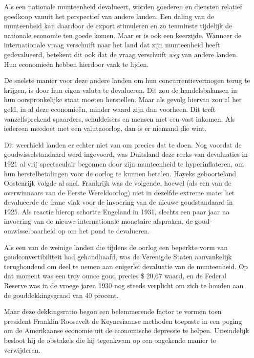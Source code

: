 \documentclass[
  a5paper,
  smalldemyvopaper,11pt,twoside,onecolumn,openright,extrafontsizes]{memoir}
\begin{document}
Als een nationale munteenheid devalueert, worden goederen en diensten
relatief goedkoop vanuit het perspectief van andere landen. Een daling
van de munteenheid kan daardoor de export stimuleren en zo tenminste
tijdelijk de nationale economie ten goede komen. Maar er is ook een
keerzijde. Wanneer de internationale vraag verschuift naar het land dat
zijn munteenheid heeft gedevalueerd, betekent dit ook dat de vraag
verschuift \emph{weg} van andere landen. Hun economieën hebben hierdoor
vaak te lijden.

De snelste manier voor deze andere landen om hun concurrentievermogen
terug te krijgen, is door hun eigen valuta te devalueren. Dit zou de
handelsbalansen in hun oorspronkelijke staat moeten herstellen. Maar als
gevolg hiervan zou al het geld, in al deze economieën, minder waard zijn
dan voorheen. Dit treft vanzelfsprekend spaarders, schuldeisers en
mensen met een vast inkomen. Als iedereen meedoet met een valutaoorlog,
dan is er niemand die wint.

Dit weerhield landen er echter niet van om precies dat te doen. Nog
voordat de goudwisselstandaard werd ingevoerd, was Duitsland deze reeks
van devaluaties in 1921 al vrij spectaculair begonnen door zijn
munteenheid te hyperinflateren, om hun herstelbetalingen voor de oorlog
te kunnen betalen. Hayeks geboorteland Oostenrijk volgde al snel.
Frankrijk was de volgende, hoewel (als een van de overwinnaars van de
Eerste Wereldoorlog) niet in dezelfde extreme mate: het devalueerde de
franc vlak voor de invoering van de nieuwe goudstandaard in 1925. Als
reactie hierop schortte Engeland in 1931, slechts een paar jaar na
invoering van de nieuwe internationale monetaire afspraken, de
goud-omwisselbaarheid op om het pond te devalueren.

Als een van de weinige landen die tijdens de oorlog een beperkte vorm
van goudconvertibiliteit had gehandhaafd, was de Verenigde Staten
aanvankelijk terughoudend om deel te nemen aan enigerlei devaluatie van
de munteenheid. Op dat moment was een troy ounce goud precies \$ 20,67
waard, en de Federal Reserve was in de vroege jaren 1930 nog steeds
verplicht om zich te houden aan de gouddekkingsgraad van 40 procent.

Maar deze dekkingsratio begon een belemmerende factor te vormen toen
president Franklin Roosevelt de Keynesiaanse methoden toepaste in een
poging om de Amerikaanse economie uit de economische depressie te
helpen. Uiteindelijk besloot hij de obstakels die hij tegenkwam op een
ongekende manier te verwijderen.
\end{document}
